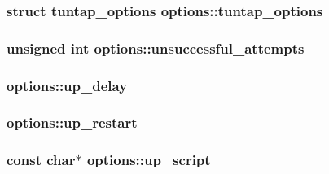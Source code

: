 \subsubsection[{tuntap\+\_\+options}]{\setlength{\rightskip}{0pt plus 5cm}struct {\bf tuntap\+\_\+options} options\+::tuntap\+\_\+options}\label{structoptions_a7464e4dafe3c9f80b09c620c83f22227}
\hypertarget{structoptions_a6b6701741dc1e5698babf4ce474984f7}{}
\subsubsection[{unsuccessful\+\_\+attempts}]{\setlength{\rightskip}{0pt plus 5cm}unsigned int options\+::unsuccessful\+\_\+attempts}\label{structoptions_a6b6701741dc1e5698babf4ce474984f7}
\hypertarget{structoptions_a38f4b8bb967c7310eaaa3d77239f7780}{}
\subsubsection[{up\+\_\+delay}]{ options\+::up\+\_\+delay}\label{structoptions_a38f4b8bb967c7310eaaa3d77239f7780}
\hypertarget{structoptions_ada4714b5025b2e2d0e863de94507d4d5}{}
\subsubsection[{up\+\_\+restart}]{ options\+::up\+\_\+restart}\label{structoptions_ada4714b5025b2e2d0e863de94507d4d5}
\hypertarget{structoptions_a4ad9197223f3b828c0caa17c59e311fd}{}
\subsubsection[{up\+\_\+script}]{\setlength{\rightskip}{0pt plus 5cm}const char$\ast$ options\+::up\+\_\+script}\label{structoptions_a4ad9197223f3b828c0caa17c59e311fd}
\hypertarget{structoptions_a2eb572d30b4a4d1e636dbdf666fc29b9}{}
